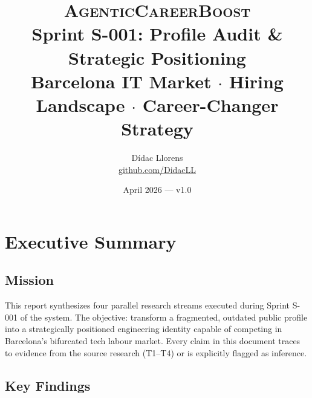 \documentclass[a4paper,11pt,openany]{report}
\title{%
  \textsc{AgenticCareerBoost}\\[0.4em]
  \Large Sprint S-001: Profile Audit \& Strategic Positioning\\[0.3em]
  \large Barcelona IT Market $\cdot$ Hiring Landscape $\cdot$ Career-Changer Strategy%
}
\author{Dídac Llorens \\ \small \href{https://github.com/DidacLL}{github.com/DidacLL}}
\date{April 2026 --- v1.0}
\begin{document}
\maketitle
\tableofcontents
\newpage

\chapter{Executive Summary}
\label{ch:executive}


\section{Mission}

This report synthesizes four parallel research streams executed during Sprint
S-001 of the \projectName{} system. The objective: transform a fragmented,
outdated public profile into a strategically positioned engineering identity
capable of competing in Barcelona's bifurcated tech labour market. Every claim
in this document traces to evidence from the source research (T1--T4) or is
explicitly flagged as inference.

\section{Key Findings}
\end{document}
